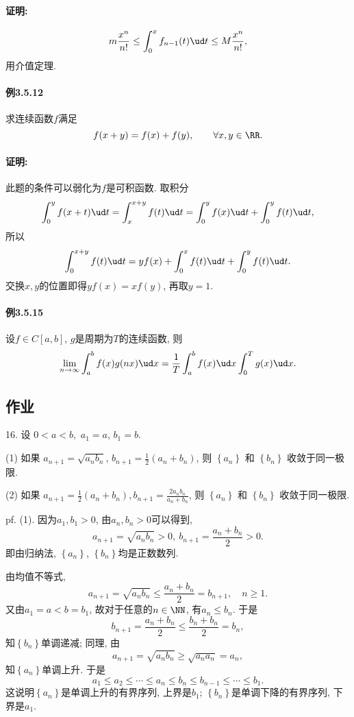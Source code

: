 \paragraph{证明:}

\[
m\frac{x^{n}}{n!}\le\int_{0}^{x}f_{n-1}(t)\ud t\le M\frac{x^{n}}{n!},
\]
用介值定理.

\paragraph{例3.5.12}

求连续函数$f$满足
\[
f(x+y)=f(x)+f(y),\qquad\forall x,y\in\RR.
\]


\paragraph{证明:}

此题的条件可以弱化为$f$是可积函数. 取积分
\[
\int_{0}^{y}f(x+t)\ud t=\int_{x}^{x+y}f(t)\ud t=\int_{0}^{y}f(x)\ud t+\int_{0}^{y}f(t)\ud t,
\]
所以
\[
\int_{0}^{x+y}f(t)\ud t=yf(x)+\int_{0}^{x}f(t)\ud t+\int_{0}^{y}f(t)\ud t.
\]
交换$x,y$的位置即得$yf(x)=xf(y)$, 再取$y=1$.

\paragraph{例3.5.15}

设$f\in C[a,b]$, $g$是周期为$T$的连续函数, 则
\[
\lim_{n\to\infty}\int_{a}^{b}f(x)g(nx)\ud x=\frac{1}{T}\int_{a}^{b}f(x)\ud x\int_{0}^{T}g(x)\ud x.
\]


\subsection{作业}

16. 设 $0<a<b,$ $a_{1}=a$, $b_{1}=b$. 

(1) 如果 $a_{n+1}=\sqrt{a_{n}b_{n}}$, $b_{n+1}=\frac{1}{2}\left(a_{n}+b_{n}\right)$,
则 $\left\{ a_{n}\right\} $ 和 $\left\{ b_{n}\right\} $ 收敛于同一极限. 

(2) 如果 $a_{n+1}=\frac{1}{2}\left(a_{n}+b_{n}\right),b_{n+1}=\frac{2a_{n}b_{n}}{a_{n}+b_{n}}$,
则 $\left\{ a_{n}\right\} $ 和 $\left\{ b_{n}\right\} $ 收敛于同一极限.

pf. (1). 因为$a_{1},b_{1}>0$, 由$a_{n},b_{n}>0$可以得到, 
\[
a_{n+1}=\sqrt{a_{n}b_{n}}>0,\ b_{n+1}=\frac{a_{n}+b_{n}}{2}>0.
\]
即由归纳法, $\left\{ a_{n}\right\} $, $\left\{ b_{n}\right\} $均是正数数列.

由均值不等式, 
\[
a_{n+1}=\sqrt{a_{n}b_{n}}\le\frac{a_{n}+b_{n}}{2}=b_{n+1},\quad n\ge1.
\]
又由$a_{1}=a<b=b_{1}$, 故对于任意的$n\in\NN$, 有$a_{n}\le b_{n}$. 于是
\[
b_{n+1}=\frac{a_{n}+b_{n}}{2}\le\frac{b_{n}+b_{n}}{2}=b_{n},
\]
知$\left\{ b_{n}\right\} $单调递减; 同理, 由
\[
a_{n+1}=\sqrt{a_{n}b_{n}}\ge\sqrt{a_{n}a_{n}}=a_{n},
\]
知$\left\{ a_{n}\right\} $单调上升. 于是
\[
a_{1}\le a_{2}\le\cdots\le a_{n}\le b_{n}\le b_{n-1}\le\cdots\le b_{1}.
\]
这说明$\left\{ a_{n}\right\} $是单调上升的有界序列, 上界是$b_{1}$; $\left\{ b_{n}\right\} $是单调下降的有界序列,
下界是$a_{1}$.

